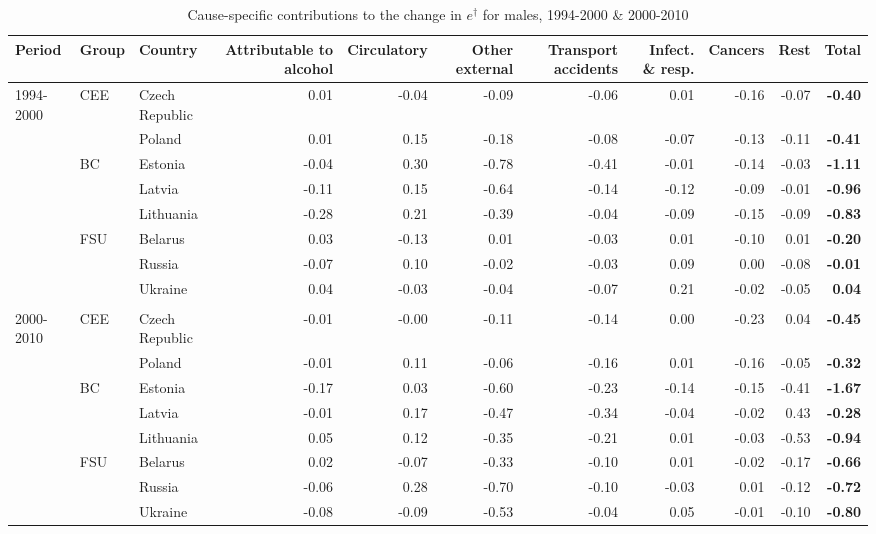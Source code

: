 \documentclass{article}
\begin{document}
\begin{landscape}
\begin{table}
\centering
\caption{Cause-specific contributions to the change in $e^\dagger$ for males, 1994-2000 \& 2000-2010}
\label{T2}
\begin{tabular}{lllrrrrrrr>{\bfseries}r}
  \hline
Period &Group& Country & Attributable to alcohol & Circulatory & Other external & Transport accidents & Infect. \& resp.  & Cancers & Rest & Total \\ 
  \hline
  \rowcolor{gray!50}
1994-2000   & CEE & Czech Republic & 0.01 & -0.04 & -0.09 & -0.06 & 0.01 & -0.16 & -0.07 & -0.40 \\ 
   & & Poland & 0.01 & 0.15 & -0.18 & -0.08 & -0.07 & -0.13 & -0.11 & -0.41 \\ 
   &BC & Estonia & -0.04 & 0.30 & -0.78 & -0.41 & -0.01 & -0.14 & -0.03 & -1.11 \\ 
   & & Latvia & -0.11 & 0.15 & -0.64 & -0.14 & -0.12 & -0.09 & -0.01 & -0.96 \\ 
   & & Lithuania & -0.28 & 0.21 & -0.39 & -0.04 & -0.09 & -0.15 & -0.09 & -0.83 \\ 
   &FSU & Belarus & 0.03 & -0.13 & 0.01 & -0.03 & 0.01 & -0.10 & 0.01 & -0.20 \\ 
   & & Russia & -0.07 & 0.10 & -0.02 & -0.03 & 0.09 & 0.00 & -0.08 & -0.01 \\ 
   & & Ukraine & 0.04 & -0.03 & -0.04 & -0.07 & 0.21 & -0.02 & -0.05 & 0.04 \\
 & & & & & & & & & & \\
    \hline
      \rowcolor{gray!50}
2000-2010   &CEE & Czech Republic & -0.01 & -0.00 & -0.11 & -0.14 & 0.00 & -0.23 & 0.04 & -0.45 \\ 
   & & Poland & -0.01 & 0.11 & -0.06 & -0.16 & 0.01 & -0.16 & -0.05 & -0.32 \\ 
   &BC & Estonia & -0.17 & 0.03 & -0.60 & -0.23 & -0.14 & -0.15 & -0.41 & -1.67 \\ 
   & & Latvia & -0.01 & 0.17 & -0.47 & -0.34 & -0.04 & -0.02 & 0.43 & -0.28 \\ 
   & & Lithuania & 0.05 & 0.12 & -0.35 & -0.21 & 0.01 & -0.03 & -0.53 & -0.94 \\ 
    &FSU & Belarus & 0.02 & -0.07 & -0.33 & -0.10 & 0.01 & -0.02 & -0.17 & -0.66 \\ 
   & & Russia & -0.06 & 0.28 & -0.70 & -0.10 & -0.03 & 0.01 & -0.12 & -0.72 \\ 
   & & Ukraine & -0.08 & -0.09 & -0.53 & -0.04 & 0.05 & -0.01 & -0.10 & -0.80 \\ 
   \hline
\end{tabular}

\end{table}
\end{landscape}
\end{document}
